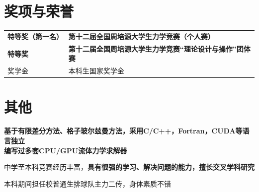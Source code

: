 \documentclass[]{deedy-resume-openfont}
\begin{document}
\begin{minipage}[t]{0.73\textwidth}

    \section{奖项与荣誉}
    \begin{tabular}{ll}
        \bf 特等奖（第一名） & \bf 第十二届全国周培源大学生力学竞赛（个人赛）        \\
        \bf 特等奖      & \bf 第十二届全国周培源大学生力学竞赛“理论设计与操作”团体赛 \\
        奖学金      & 本科生国家奖学金                     \\
    \end{tabular}
    \sectionsep


    \section{其他}
    \begin{tightemize}
        \item {\bf 基于有限差分方法、格子玻尔兹曼方法，采用C/C++，Fortran，CUDA等语言独立\\编写过多套CPU/GPU流体力学求解器}
        \item 中学至本科竞赛经历丰富，{\bf 具有很强的学习、解决问题的能力，擅长交叉学科研究}
        \item 本科期间担任校普通生排球队主力二传，身体素质不错
    \end{tightemize}
    \sectionsep




\end{minipage}
\end{document}
